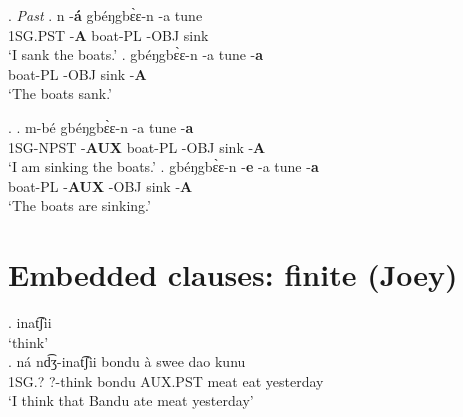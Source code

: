 \documentclass{assets/fieldnotes}
\begin{document}
\ex. \textit{Past}
\ag.
n     -\textbf{á}   gbéŋgbɛ̀ɛ-n   -a     tune \\
1SG.PST   -\textbf{A}   boat-PL      -OBJ   sink \\
`I sank the boats.'
\bg.
\phantom{n}     \phantom{-á}            gbéŋgbɛ̀ɛ-n   -a     tune   -\textbf{a} \\
\phantom{1SG}      boat-PL      -OBJ   sink   -\textbf{A} \\
`The boats sank.'

\ex. 
\ag.
m-bé    gbéŋgbɛ̀ɛ-n   {}                        -a     tune   -\textbf{a} \\
1SG-NPST   -\textbf{AUX}   boat-PL         -OBJ   sink   -\textbf{A} \\
`I am sinking the boats.'
\bg.
{}              {}                        gbéŋgbɛ̀ɛ-n   -\textbf{e}     -a     tune   -\textbf{a} \\
\phantom{1SG}      boat-PL      -\textbf{AUX}   -OBJ   sink   -\textbf{A} \\
`The boats are sinking.'



\section{Embedded clauses: finite (Joey)} 



\ex. inat͡ʃii \\
    `think' \\

\exg. ná nd͡ʒ-inat͡ʃii bondu à swee dao kunu\\
1SG.? ?-think bondu AUX.PST meat eat yesterday\\
    `I think that Bandu ate meat yesterday'\\



\end{document}
